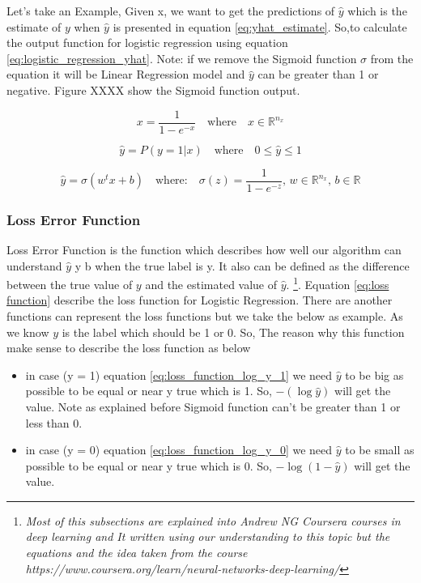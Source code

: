 Let's take an Example, Given x, we want to get the predictions of $\widehat{y}$ which is the estimate of $y$  when $\widehat{y}$  is presented in equation \eqref{eq:yhat_estimate}. So,to calculate the output function for logistic regression using equation \eqref{eq:logistic_regression_yhat}. Note: if we remove the Sigmoid function $\sigma$ from the equation it will be Linear Regression model and $\widehat{y}$ can be greater than 1 or negative. Figure XXXX show the Sigmoid function output. %

\begin{equation}\label{eq:logistic_function}
  x = \frac{1}{1-e^{-x}} \quad \text{where} \quad x \in \mathbb{R}^{n_x} 
\end{equation}

\begin{equation}
  \label{eq:yhat_estimate}
    \widehat{y} = P(y=1 | x) \quad \text{where}  \quad 0 \le \widehat{y}  \le 1
  \end{equation}

\begin{equation}
  \label{eq:logistic_regression_yhat}
  \widehat{y} = \sigma(w^t x + b) \quad \text{where:} \quad  \sigma(z) = \frac{1}{1-e^{-z}} \text{, }  w \in  \mathbb{R}^{n_x} \text{, }  b \in  \mathbb{R}  
\end{equation}


\subsubsection{Loss Error Function}

Loss Error Function is the function which describes how well our algorithm can understand  $\widehat{y}$ y b when the true label is y. It also can be defined as the difference between the true value of $y$ and the estimated value of  $\widehat{y}$. \footnote{\textit{Most of this subsections are explained into Andrew NG Coursera courses in deep learning and It written using our understanding to this topic but the equations and the idea taken from the course  https://www.coursera.org/learn/neural-networks-deep-learning/}}. Equation \eqref  {eq:loss function} describe the loss function for Logistic Regression. There are another functions can represent the loss functions but we take the below as example. As we know $y$ is the label which should be 1 or 0. So, The reason why this function make sense to describe the loss function as below
\begin{itemize}
\item in case (y = 1) equation \eqref{eq:loss_function_log_y_1} we need $\widehat{y}$ to be big as possible to be equal or near y true which is 1. So, $ - (\log \widehat{y} )$ will get the value. Note as explained before Sigmoid function can't be greater than 1 or less than 0. %
\item in case (y = 0) equation \eqref{eq:loss_function_log_y_0} we need $\widehat{y}$ to be small as possible to be equal or near y true which is 0. So, $- \log (1-\widehat{y})$  will get the value.  %
  \end{itemize}
  
